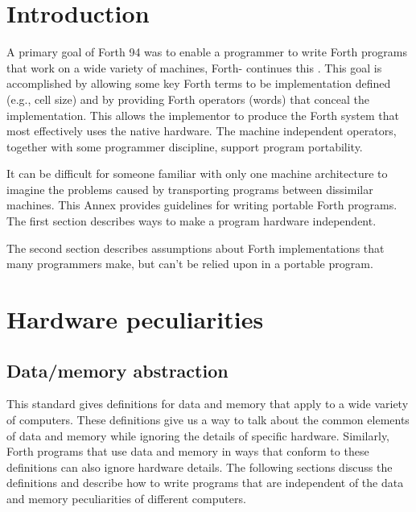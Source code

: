 \label{annex:port}

\section{Introduction} %
\label{port:intro}

A primary goal of Forth 94 was to enable a programmer to write Forth
programs that work on a wide variety of machines, Forth-\snapshot{}
continues this .  This goal is accomplished by allowing some
key Forth terms to be implementation defined (e.g., cell size) and
by providing Forth operators (words) that conceal the implementation.
This allows the implementor to produce the Forth system that most
effectively uses the native hardware. The machine independent
operators, together with some programmer discipline, support program
portability.

It can be difficult for someone familiar with only one machine
architecture to imagine the problems caused by transporting programs
between dissimilar machines.
This Annex provides guidelines for writing portable Forth programs.
The first section describes ways to make a program hardware independent.

The second section describes assumptions about Forth implementations
that many programmers make, but can't be relied upon in a portable program.


\section{Hardware peculiarities} %
\label{port:hardware}

\subsection{Data/memory abstraction} %

This standard gives definitions for data and memory that
apply to a wide variety of computers. These definitions give us a way
to talk about the common elements of data and memory while ignoring
the details of specific hardware. Similarly, Forth programs that
use data and memory in ways that conform to these definitions can
also ignore hardware details. The following sections discuss the
definitions and describe how to write programs that are independent
of the data and memory peculiarities of different computers.

